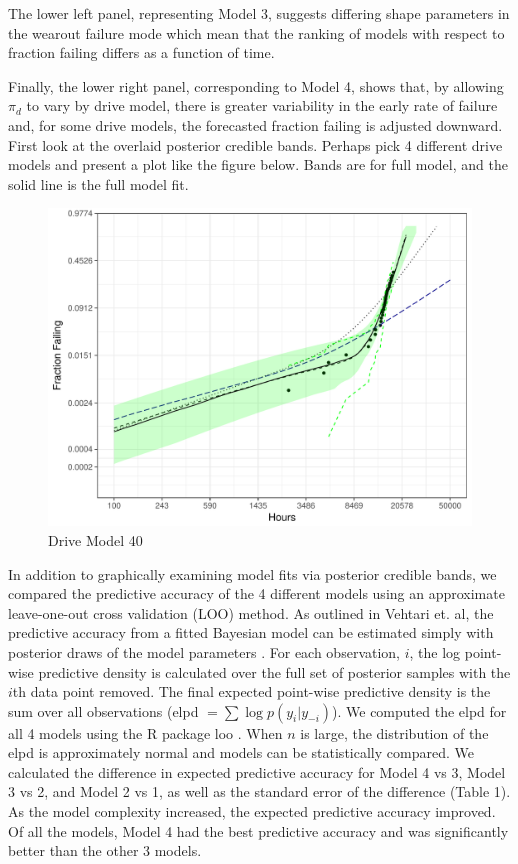 \documentclass[12pt]{article}
\begin{document}
The lower left panel, representing Model 3, suggests differing shape parameters in the wearout failure mode which mean that the ranking of models with respect to fraction failing differs as a function of time.

Finally, the lower right panel, corresponding to Model 4, shows that, by allowing $\pi_d$ to vary by drive model, there is greater variability in the early rate of failure and, for some drive models, the forecasted fraction failing is adjusted downward. 
First look at the overlaid posterior credible bands.  Perhaps pick 4 different drive models and present a plot like the figure below.  Bands are for full model, and the solid line is the full model fit. \\

\begin{figure}[H]
    \centering
   \includegraphics[width=5.0in]{fig/mod40_bands.pdf}
		\caption{Drive Model 40 \label{fig:first}} 
\end{figure}


In addition to graphically examining model fits via posterior credible bands, we compared the predictive accuracy of the 4 different models using an approximate leave-one-out cross validation (LOO) method.  As outlined in Vehtari et. al, the predictive accuracy from a fitted Bayesian model can be estimated simply with posterior draws of the model parameters \cite{vehtari}.  For each observation, $i$, the log point-wise predictive density is calculated over the full set of posterior samples with the $i$th data point removed.  The final expected point-wise predictive density is the sum over all observations (elpd $=\sum{\log p(y_i|y_{-i})}$).  We computed the elpd for all 4 models using the R package loo \cite{loo}.  When $n$ is large, the distribution of the elpd is approximately normal and models can be statistically compared.  We calculated the difference in expected predictive accuracy for Model 4 vs 3, Model 3 vs 2, and Model 2 vs 1, as well as the standard error of the difference (Table 1).  As the model complexity increased, the expected predictive accuracy improved.  Of all the models, Model 4 had the best predictive accuracy and was significantly better than the other 3 models.
\end{document}
